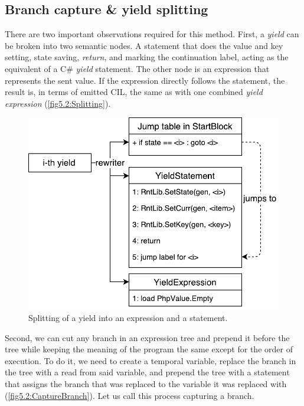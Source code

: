 \subsection{Branch capture \& yield splitting}

There are two important observations required for this method. First, a \emph{yield} can be broken into two semantic nodes. A statement that does the value and key setting, state saving, \emph{return}, and marking the continuation label, acting as the equivalent of a C\# \emph{yield} statement. The other node is an expression that represents the sent value. If the expression directly follows the statement, the result is, in terms of emitted CIL, the same as with one combined \emph{yield expression} (\autoref{fig5.2:Splitting}). 


\begin{figure}[h]
	\centering	
	\includegraphics[scale=0.75]{../img/5_2_yieldSplitting}	
	\caption{Splitting of a yield into an expression and a statement.}
	\label{fig5.2:Splitting}
\end{figure}

Second, we can cut any branch in an expression tree and prepend it before the tree while keeping the meaning of the program the same except for the order of execution. To do it, we need to create a temporal variable, replace the branch in the tree with a read from said variable, and prepend the tree with a statement that assigns the branch that was replaced to the variable it was replaced with (\autoref{fig5.2:CaptureBranch}). Let us call this process capturing a branch.

